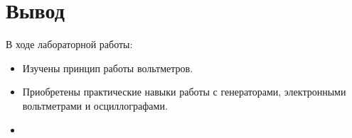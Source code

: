 \section{Вывод}
В ходе лабораторной работы:
\begin{itemize}
\item
  Изучены принцип работы вольтметров.
\item
  Приобретены  практические навыки работы с генераторами, электронными вольтметрами и осциллографами.
\item

\end{itemize}
\clearpage
